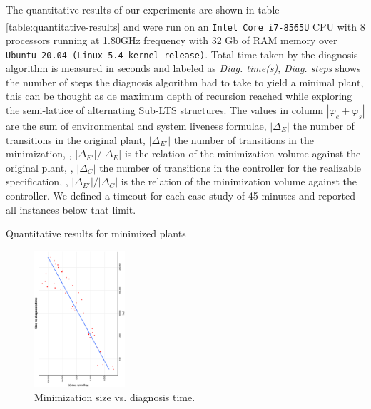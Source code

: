 The quantitative results of our experiments are shown in table 
\ref{table:quantitative-results} and were run on an 
\texttt{Intel\textsuperscript{\textregistered} Core\textsuperscript{\texttrademark}
 i7-8565U} CPU with 8 processors running at 1.80GHz frequency
with 32 Gb of RAM memory over \texttt{Ubuntu 20.04 (Linux 5.4 kernel release)}.
Total time taken by the diagnosis algorithm is measured in seconds and
labeled as \emph{Diag. time(s)}, \emph{Diag. steps} shows the number of steps the diagnosis algorithm had to take to yield a minimal plant, this can be thought as de maximum depth of recursion reached while exploring the semi-lattice of alternating Sub-LTS structures.  The values in column $|\varphi_e + \varphi_s|$ are the sum of environmental and system liveness formulae, $|\Delta_{E}|$ the number of transitions in the original plant, $|\Delta_{E'}|$ the number of transitions in the minimization,
, $|\Delta_{E'}|/|\Delta_{E}|$ is the relation of the minimization volume against the original plant, , $|\Delta_{C}|$ the number of transitions in the controller for the realizable specification,
, $|\Delta_{E'}|/|\Delta_{C}|$ is the relation of the minimization volume against the controller.
We defined a timeout for each case study of 45 minutes and reported all instances below that limit.
\begin{table}
	\resizebox{\textwidth}{!} {

}
  \caption{Quantitative results for minimized plants}
  \label{table:quantitative-results}
 \end{table}
\begin{figure}[bt]
	\centering
	\SmallPicture
	\includegraphics[width=0.3\textwidth, angle=-90]{../experimental_setting/tmp_results/size_vs_diag_time.ps}
	\vspace*{-2mm}
	\caption{Minimization size vs. diagnosis time.}
	\label{fig:size_vs_diag_time}
	\vspace*{-4mm}
	\MediumPicture
\end{figure}
